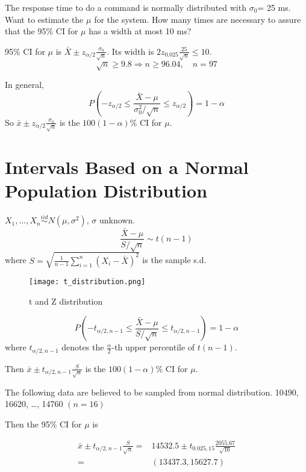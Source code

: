 \begin{exmp}
The response time to do a command is normally distributed with $\sigma_0$= 25 ms. Want to estimate the $\mu$ for the system. How many times are necessary to assure that the 95\% CI for $\mu$ has a width at most 10 ms? 

95\% CI for $\mu$ is $\bar{X}\pm z_{\alpha/2} \frac{\sigma_0}{\sqrt{n}} $. Its width is $2 z_{0.025} \frac{25}{\sqrt{n}} \leq 10$.
\[\sqrt{n}\geq 9.8 \Rightarrow n\geq 96.04, \quad n=97\]

\end{exmp}

\begin{prop}
In general,
 \[P\left(-z_{\alpha/2} \leq \frac{\bar{X}-\mu}{\sigma_0^2/\sqrt{n}}  \leq  z_{\alpha/2} \right) = 1-\alpha\]
So $\bar{x} \pm  z_{\alpha/2} \frac{\sigma_0}{\sqrt{n}} $ is the $100(1-\alpha)\%$ CI for $\mu$.
\end{prop}

\section{Intervals Based on a Normal Population Distribution}
\noindent{}

\begin{theo}
$X_1,\dots,X_n \overset{iid}{\sim} N(\mu,\sigma^2)$, $\sigma$ unknown.
\[\frac{\bar{X}-\mu}{S/\sqrt{n}} \sim t(n-1)\]
where $S=\sqrt{\frac{1}{n-1} \sum_{i=1}^n (X_i-\bar{X})^2}$ is the sample s.d.

\begin{figure}[H]
\caption{t and Z distribution}
\centering
\texttt{[image: t\_distribution.png]}
\end{figure}

\[P\left(-t_{\alpha/2,n-1} \leq \frac{\bar{X}-\mu}{S/\sqrt{n}}  \leq  t_{\alpha/2,n-1} \right) = 1-\alpha\]
where $t_{\alpha/2,n-1}$ denotes the $\frac{\alpha}{2}$-th upper percentile of $t(n-1)$.

Then $\bar{x} \pm  t_{\alpha/2,n-1} \frac{S}{\sqrt{n}} $ is the $100(1-\alpha)\%$ CI for $\mu$.
\end{theo}

\begin{exmp}
The following data are believed to be sampled from normal distribution. 10490, 16620, \dots, 14760 $(n=16)$

Then the 95\% CI for $\mu$ is 

\begin{align*}
\bar{x} \pm  t_{\alpha/2,n-1} \frac{S}{\sqrt{n}}=&14532.5 \pm  t_{0.025,15} \frac{2055.67}{\sqrt{16}}\\
=&(13437.3, 15627.7)
\end{align*} 

\end{exmp}
